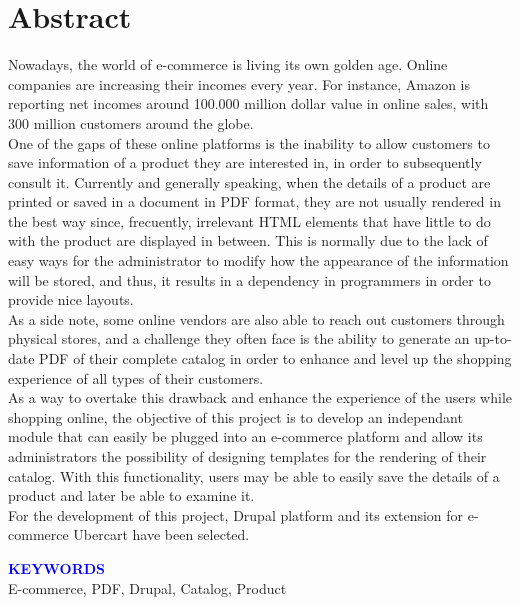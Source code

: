 \chapter{Abstract}

	Nowadays, the world of e-commerce is living its own golden age. Online companies are increasing their incomes every year. For instance, 
	Amazon is reporting net incomes around 100.000 million dollar value in online sales, with 300 million customers around the globe.\\

	One of the gaps of these online platforms is the inability to allow customers to save information of a product they are interested in, in order to subsequently consult it. Currently and generally speaking, when the details of a product are printed or saved in a document in PDF format, they are not usually rendered in the best way since, frecuently, irrelevant HTML elements that have little to do with the product are displayed in between. This is normally due to the lack of easy ways for the administrator to modify how the appearance of the information will be stored, and thus, it results in a dependency in programmers in order to provide nice layouts. \\
	As a side note, some online vendors are also able to reach out customers through physical stores, and a challenge they often face is the ability to generate an up-to-date PDF of their complete catalog in order to enhance and level up the shopping experience of all types of their customers.\\

	As a way to overtake this drawback and enhance the experience of the users while shopping online, the objective of this project is to develop an independant module that can easily be plugged into an e-commerce platform and allow its administrators the possibility of designing templates for the rendering of their catalog. With this functionality, users may be able to easily save the details of a product and later be able to examine it.\\
	For the development of this project, Drupal platform and its extension for e-commerce Ubercart have been selected.

\vspace{1cm}
{\textcolor{blue}{\large\bf KEYWORDS}}\\
E-commerce, PDF, Drupal, Catalog, Product